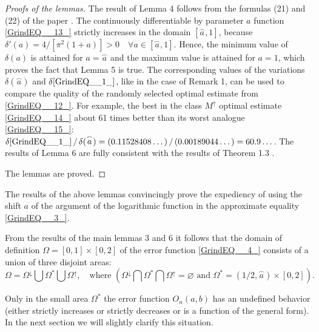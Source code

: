 \documentclass[
11pt,%
tightenlines,%
twoside,%
onecolumn,%
nofloats,%
nobibnotes,%
nofootinbib,%
superscriptaddress,%
noshowpacs,%
centertags]%
{revtex4}
\begin{document}
\begin{proof}[Proofs of the lemmas]
	The result of Lemma 4 follows from the formulas (21) and (22) of the paper \cite{Sh19}. The continuously differentiable by parameter $a$ function \eqref{GrindEQ__13_} strictly increases in the domain $[\stackrel{\frown}{a},   1]$, because $\delta '(a)  =  4/ [\pi ^{2} (1+a)]   >0   \quad  \forall  a\in [\stackrel{\frown}{a},   1]$. Hence, the minimum value of $\delta (a)$ is attained for $ a= \stackrel{\frown}{a}$ and the maximum value is attained for $a= 1$, which proves the fact that Lemma 5 is true. The corresponding values of the variations $\delta (\stackrel{\frown}{a})$ and $\delta \eqref{GrindEQ__1_} $, like in the case of Remark 1, can be used to compare the quality of the randomly selected optimal estimate from \eqref{GrindEQ__12_}. For example, the best in the class $M^{\uparrow } $   optimal estimate \eqref{GrindEQ__14_} about 61 times better than its worst analogue \eqref{GrindEQ__15_}: $\delta \eqref{GrindEQ__1_}\,/\, \delta (\stackrel{\frown}{a}) = (0.11528408\dots)\, /\, (0.00189044\dots) = 60.9\dots $. The results of Lemma 6 are fully consistent with the results of Theorem 1.3 \cite{Sh19}.

	The lemmas are proved.
\end{proof}

\begin{remark}
	The results of the above lemmas convincingly prove the expediency of using the shift $a$ of the argument of the logarithmic function in the approximate equality \eqref{GrindEQ__3_}.
\end{remark}

From the results of the main lemmas 3 and 6 it follows that the domain of definition $\Omega  =[0, 1]\times [0, 2]$ of the error function \eqref{GrindEQ__4_} consists of a union of three disjoint areas:
\begin{equation}\label{GrindEQ__16_}
\Omega  = \Omega ^{\downarrow } \bigcup  \Omega ^{*} \bigcup  \Omega ^{\uparrow },  \quad  \text{where }
\left(\Omega ^{\downarrow } \bigcap  \Omega ^{*} \bigcap  \Omega ^{\uparrow }  = \varnothing\,\, \text{and} \,\, \Omega ^{*} =(1/2,\stackrel{\frown}{a})\times [0,2]\right).
\end{equation}

Only in the small area  $\Omega ^{*} $ the error function  $O_{n} (a, b)$ has an undefined behavior (either strictly increases or strictly decreases or is a function of the general form). In the next section we will slightly clarify this situation.
\end{document}
